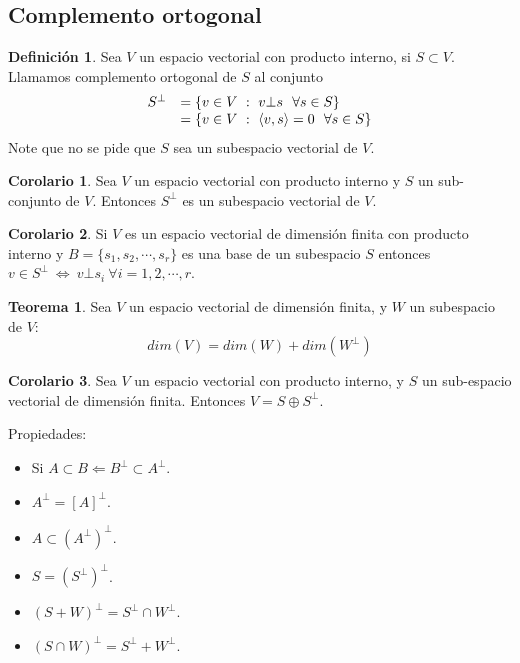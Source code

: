 \documentclass[10pt]{article}
\theoremstyle{definition}
\newtheorem{definition}{Definición}[section]
\newtheorem{theorem}{Teorema}[section]
\newtheorem{corollary}{Corolario}[theorem]
\begin{document}
\subsection{Complemento ortogonal}
\begin{definition}
    Sea $V$ un espacio vectorial con producto interno, si $S\subset V$. Llamamos complemento ortogonal de $S$ al conjunto $$\begin{array}{ c l }
S^{\bot } & =\{v\in V\ :\ v\bot s\ \ \forall s\in S\}\\
 & =\{v\in V\ :\ \langle v,s\rangle =0\ \ \forall s\in S\}
\end{array}$$
Note que no se pide que $S$ sea un subespacio vectorial de $V$.
\end{definition}
\begin{corollary}
    Sea $V$ un espacio vectorial con producto interno y $S$ un sub-conjunto de $V$. Entonces $S^\bot$ es un subespacio vectorial de $V$.
\end{corollary}
\begin{corollary}
    Si $V$ es un espacio vectorial de dimensión finita con producto interno y $B=\{s_1,s_2,\cdots,s_r\}$ es una base de un subespacio $S$ entonces $v\in S^\bot\ \Leftrightarrow\ v\bot s_i\ \forall i=1,2,\cdots,r$.
\end{corollary}
\begin{theorem}
    Sea $V$ un espacio vectorial de dimensión finita, y $W$ un subespacio de $V$:$$dim(V)=dim(W)+dim(W^\bot)$$
\end{theorem}
\begin{corollary}
    Sea $V$ un espacio vectorial con producto interno, y $S$ un sub-espacio vectorial de dimensión finita. Entonces $V=S\oplus S^\bot$.
\end{corollary}
Propiedades:
\begin{itemize}
    \item Si $A\subset B \Leftarrow B^\bot \subset A^\bot$.
    \item $A^\bot = [A]^\bot$.
    \item $A\subset (A^\bot)^\bot$.
    \item $S=(S^\bot)^\bot$.
    \item $(S+W)^\bot =S^\bot \cap W^\bot$.
    \item $(S\cap W)^\bot = S^\bot + W^\bot$.
\end{itemize}
\end{document}
